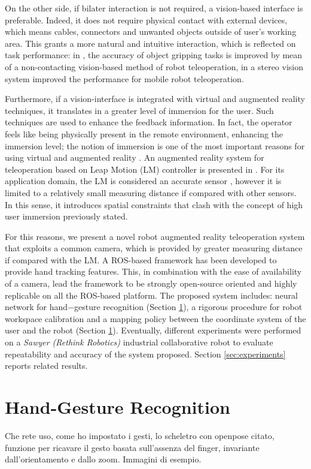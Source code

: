 \documentclass[letterpaper, 10 pt, conference]{ieeeconf}  %
\begin{document}
On the other side, if bilater interaction is not required, a vision-based interface is preferable. Indeed, it does not require physical contact with external devices, which means cables, connectors and unwanted objects outside of user's working area. This grants a more natural and intuitive interaction, which is reflected on task performance: in \cite{Kofman2005}, the accuracy of object gripping tasks is improved by mean of a non-contacting vision-based method of robot teleoperation, in \cite{Livatino2009} a stereo vision system improved the performance for mobile robot teleoperation.

Furthermore, if a vision-interface is integrated with virtual and augmented reality techniques, it translates in a greater level of immersion for the user. Such techniques are used to enhance the feedback information. In fact, the operator feels like being physically present in the remote environment, enhancing the immersion level; the notion of immersion is one of the most important reasons for using virtual and augmented reality \cite{Boboc2012}. An augmented reality system for teleoperation based on Leap Motion (LM) controller is presented in \cite{Peppoloni2015}. For its application domain, the LM is considered an accurate sensor \cite{Hedayati2018}, however it is limited to a relatively small measuring distance if compared with other sensors. In this sense, it introduces spatial constraints that clash with the concept of high user immersion previously stated.

For this reasons, we present a novel robot augmented reality teleoperation system that exploits a common camera, which is provided by greater measuring distance if compared with the LM. A ROS-based framework has been developed to provide hand tracking features. This, in combination with the ease of availability of a camera, lead the framework to be strongly open-source oriented and highly replicable on all the ROS-based platform. The proposed system includes: neural network for hand$-$gesture recognition (Section \ref{sec:HG_recon}),
a rigorous procedure for robot workspace calibration and a mapping policy between the coordinate system of the user and the robot (Section \ref{sec:HG_recon}). 
Eventually, different experiments were performed on a \textit{Sawyer (Rethink Robotics)} industrial collaborative robot to evaluate repeatability and accuracy of the system proposed. Section \ref{sec:experiments} reports related results.

\section{Hand-Gesture Recognition}\label{sec:HG_recon}
Che rete uso, come ho impostato i gesti, lo scheletro con openpose citato, funzione per ricavare il gesto basata sull'assenza del finger, invariante dall'orientamento e dallo zoom. Immagini di esempio.
\end{document}
